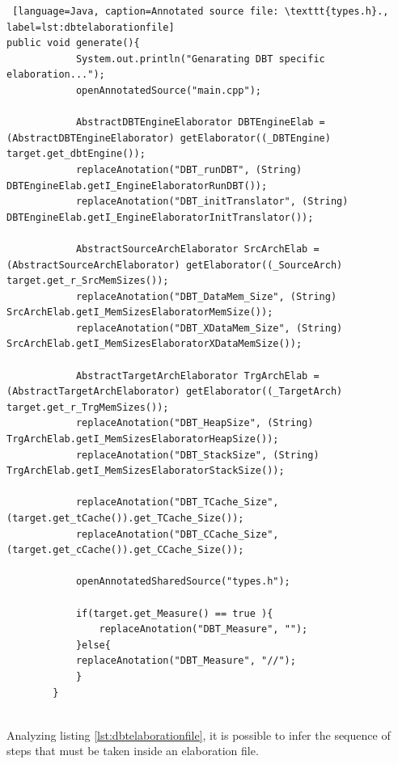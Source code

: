 \documentclass[12pt]{article}
\begin{document}
{\begin{lstlisting} [language=Java, caption=Annotated source file: \texttt{types.h}., label=lst:dbtelaborationfile]
public void generate(){
			System.out.println("Genarating DBT specific elaboration...");
			openAnnotatedSource("main.cpp");   
		
			AbstractDBTEngineElaborator DBTEngineElab = (AbstractDBTEngineElaborator) getElaborator((_DBTEngine) target.get_dbtEngine());
			replaceAnotation("DBT_runDBT", (String) DBTEngineElab.getI_EngineElaboratorRunDBT());
			replaceAnotation("DBT_initTranslator", (String) DBTEngineElab.getI_EngineElaboratorInitTranslator());
		
			AbstractSourceArchElaborator SrcArchElab = (AbstractSourceArchElaborator) getElaborator((_SourceArch) target.get_r_SrcMemSizes());
			replaceAnotation("DBT_DataMem_Size", (String) SrcArchElab.getI_MemSizesElaboratorMemSize());
			replaceAnotation("DBT_XDataMem_Size", (String) SrcArchElab.getI_MemSizesElaboratorXDataMemSize());
		
			AbstractTargetArchElaborator TrgArchElab = (AbstractTargetArchElaborator) getElaborator((_TargetArch) target.get_r_TrgMemSizes());
			replaceAnotation("DBT_HeapSize", (String) TrgArchElab.getI_MemSizesElaboratorHeapSize());
			replaceAnotation("DBT_StackSize", (String) TrgArchElab.getI_MemSizesElaboratorStackSize());
		
			replaceAnotation("DBT_TCache_Size",(target.get_tCache()).get_TCache_Size());
			replaceAnotation("DBT_CCache_Size",(target.get_cCache()).get_CCache_Size());
		
			openAnnotatedSharedSource("types.h");
		
			if(target.get_Measure() == true ){
				replaceAnotation("DBT_Measure", "");
			}else{
			replaceAnotation("DBT_Measure", "//");
			}
		}
     
\end{lstlisting}


Analyzing listing \ref{lst:dbtelaborationfile}, it is possible to infer the sequence of steps that must be taken inside an elaboration file.

}
\end{document}
